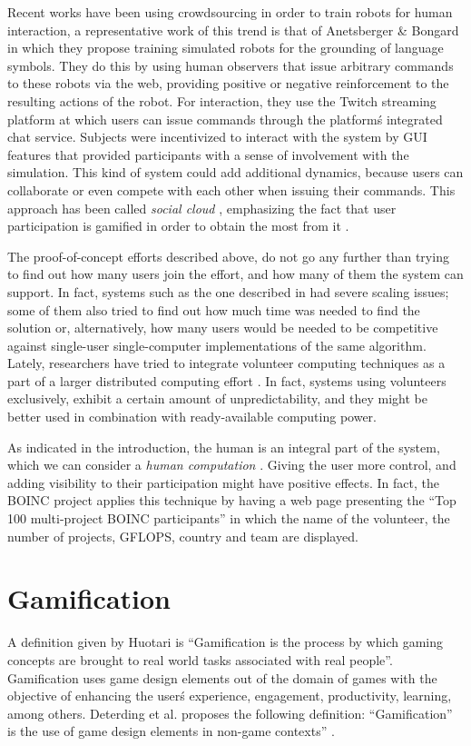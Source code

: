 \documentclass{llncs}
\begin{document}
Recent works have been using crowdsourcing in order to train robots
for human interaction, a representative work of this trend is that of
Anetsberger \& Bongard \cite{anetsbergerrobots} in which they propose
training simulated robots for the grounding of language symbols. They do this by using human observers that issue arbitrary commands to these robots via the web, providing positive or negative reinforcement to the resulting actions of the robot. For interaction, they use the Twitch streaming platform at which users can issue commands through the
platform\'s integrated chat service. Subjects were incentivized to
interact with the system by GUI features that provided participants
with a sense of involvement with the simulation. This kind of system
could add additional dynamics, because users can collaborate or
even compete with each other when issuing their commands. This approach has been called {\em social cloud} \cite{6404452}, emphasizing the fact that user participation is gamified in order to obtain the most from it \cite{7027564}.

The proof-of-concept efforts described above, do not go any further than trying to find out how many users join the effort, and how many of them the system can support. In fact, systems such as the one described in
\cite{gecco07:workshop:dcor} had severe scaling issues; some of them
also tried to find out how much time was needed to find the solution
or, alternatively, how many users would be needed to be competitive
against single-user single-computer implementations of the same
algorithm. Lately, researchers have tried to integrate volunteer computing techniques as a part of a larger distributed computing effort \cite{leclerc2016seamless}.  In fact, systems using volunteers exclusively, exhibit a certain amount of unpredictability, and they might be better used in combination with ready-available computing power.

As indicated in the introduction, the human is an integral part of the system, which we can consider a {\em human computation} \cite{quinn2011human}. Giving the user more control, and adding visibility to their participation might have positive effects. In fact, the BOINC project applies this technique by having a web page presenting the ``Top 100 multi-project BOINC participants'' in which the name of the volunteer, the number of projects, GFLOPS, country and team are displayed.

\section{Gamification}
\label{sec:gamification}
A definition given by Huotari  \cite{huotari2012defining} is ``Gamification is
the process by which gaming concepts are brought to real world tasks associated with
real people''. Gamification uses game design elements out of the domain of games
with the objective of enhancing the user\'s experience, engagement, productivity,
learning, among others. Deterding et al. proposes the following definition:
 ``Gamification” is the use of game design elements in non-game contexts''
 \cite{deterding2011gamification}.
\end{document}
